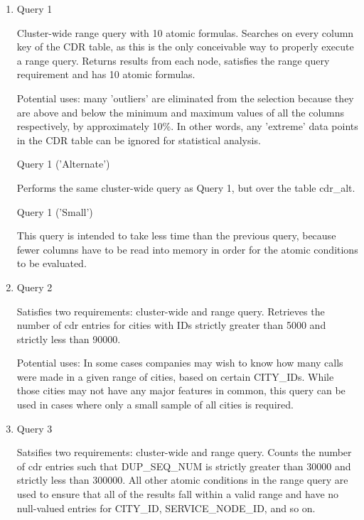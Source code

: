 \documentclass[letterpaper]{article}
\begin{document}
\begin{enumerate}
	\item Query 1
		

		Cluster-wide range query with 10 atomic formulas. Searches on
		every column key of the CDR table, as this is the only
		conceivable way to properly execute a range query.  Returns
		results from each node, satisfies the range query requirement
		and has 10 atomic formulas.

		Potential uses: many 'outliers' are eliminated from the
		selection because they are above and below the minimum and
		maximum values of all the columns
		respectively, by approximately 10\%. In other words, any
		'extreme' data points in the CDR table can be ignored for
		statistical analysis.

		Query 1 ('Alternate')

		Performs the same cluster-wide query as Query 1, but over the table cdr\_alt.

		Query 1 ('Small')

		This query
		is intended to take less time than the previous query, because fewer columns
		have to be read into memory in order for the atomic conditions to be evaluated.

	\item Query 2
		

		Satisfies two requirements: cluster-wide and range query. Retrieves the number of
		cdr entries for cities with IDs strictly greater than 5000 and strictly less than
		90000. 

		Potential uses: In some cases companies may wish to know how many calls were made
		in a given range of cities, based on certain CITY\_IDs. While
		those cities may not have any major features in common, this
		query can be used in cases where only a small
		sample of all cities is required.

	\item Query 3
		

		Satsifies two requirements: cluster-wide and range query. Counts the number of cdr
		entries such that DUP\_SEQ\_NUM is strictly greater than 30000 and strictly less than
		300000. All other atomic conditions in the range query are used to ensure that
		all of the results fall within a valid range and have no null-valued entries for
		CITY\_ID, SERVICE\_NODE\_ID, and so on.


\end{enumerate}
\end{document}
